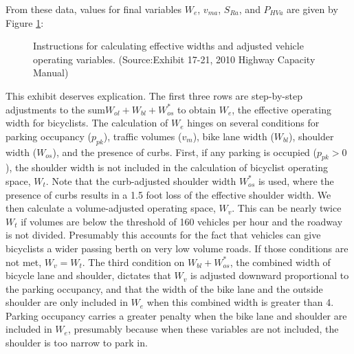 \documentclass[11pt]{article} %
\begin{document}

From these data, values for final variables $W_e$, $v_{ma}$, $S_{Ra}$, and  $P_{HVa}$ are given by Figure \ref{fig:HCM_ex17-21}:



\begin{figure}[h]
\centering
{}

\caption{Instructions for calculating effective widths and adjusted vehicle operating variables. (Source:Exhibit 17-21, 2010 Highway Capacity Manual)}

\label{fig:HCM_ex17-21}

\end{figure}


This exhibit deserves explication. The first three rows are step-by-step adjustments to the sum$W_{ol} + W_{bl} + W_{os}^*$ to obtain $W_e$, the effective operating width for bicyclists. The calculation of $W_e$ hinges on several conditions for parking occupancy ($p_{pk}$), traffic volumes ($v_m$), bike lane width ($W_{bl}$), shoulder width ($W_{os}$), and the presence of curbs. First, if any parking is occupied ($p_{pk}>0$), the shoulder width is not included in the calculation of bicyclist operating space, $W_t$. Note that the curb-adjusted shoulder width $W_{os}^*$ is used, where the presence of curbs results in a 1.5 foot loss of the effective shoulder width. We then calculate a volume-adjusted operating space, $W_v$. This can be nearly twice $W_t$ if volumes are below the threshold of 160 vehicles per hour and the roadway is not divided. Presumably this accounts for the fact that vehicles can give bicyclists a wider passing berth on very low volume roads. If those conditions are not met, $W_v = W_t$. The third condition on $W_{bl}+W_{os}^*$, the combined width of bicycle lane and shoulder, dictates that $W_v$ is adjusted downward proportional to the parking occupancy, and that the width of the bike lane and the outside shoulder are only included in $W_e$ when this combined width is greater than 4. Parking occupancy carries a greater penalty when the bike lane and shoulder are included in $W_e$, presumably because when these variables are not included, the shoulder is too narrow to park in. 
\end{document}
